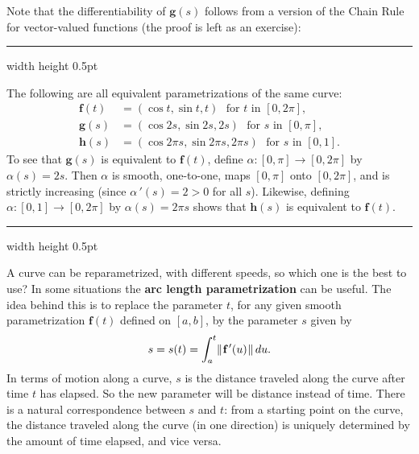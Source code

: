Note that the differentiability of $\textbf{g}(s)$ follows from a version of the Chain Rule for vector-valued
functions (the proof is left as an exercise):

\vspace{2mm}
\hrule width \textwidth height 0.5pt
\begin{exmp}\label{exmp:paramhelix}
 The following are all equivalent parametrizations of the same curve:
 \begin{align*}
  \textbf{f}(t) &= (\cos t , \sin t , t) \text{~~for $t$ in~$[0,2\pi]$},\\
  \textbf{g}(s) &= (\cos 2s , \sin 2s , 2s) \text{~~for $s$ in~$[0,\pi]$},\\
  \textbf{h}(s) &= (\cos 2\pi s , \sin 2\pi s , 2\pi s) \text{~~for $s$ in~$[0,1]$.}
 \end{align*}
 To see that $\textbf{g}(s)$ is equivalent to $\textbf{f}(t)$, define $\alpha:[0,\pi] \rightarrow [0,2\pi]$ by
 $\alpha(s) = 2s$. Then $\alpha$ is smooth, one-to-one, maps $[0,\pi]$ onto $[0,2\pi]$, and is strictly increasing
 (since $\alpha\,'(s) = 2 > 0$ for all $s$). Likewise, defining $\alpha:[0,1] \rightarrow [0,2\pi]$ by
 $\alpha(s) = 2\pi s$ shows that $\textbf{h}(s)$ is equivalent to $\textbf{f}(t)$.
\end{exmp}
\hrule width \textwidth height 0.5pt
\vskip3mm

A curve can be reparametrized, with different speeds, so which one is the best to use? In some situations
the \textbf{arc length parametrization} can be useful. The idea behind this is to replace the parameter $t$, for any
given smooth parametrization $\textbf{f}(t)$ defined on $[a,b]$, by the parameter $s$ given by
\begin{equation}\label{eqn:arclenfcn}
 s = s(t) = \int_{a}^{t} \lVert\mspace{1mu}\textbf{f}\,'(u)\mspace{1mu}\rVert\,du .
\end{equation}
In terms of motion along a curve, $s$ is the distance traveled along the curve after time $t$ has elapsed.
So the new parameter will be distance instead of time.
There is a natural correspondence between $s$ and $t$: from a starting point on the curve, the distance
traveled along the curve (in one direction) is uniquely determined by the amount of time elapsed, and vice versa.

